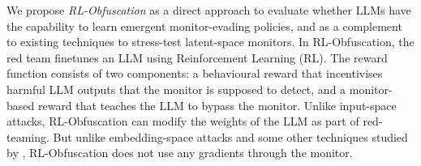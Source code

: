 We propose \emph{RL-Obfuscation} as a direct approach to evaluate whether LLMs have the capability to learn emergent monitor-evading policies, and as a complement to existing techniques to stress-test latent-space monitors. In RL-Obfuscation, the red team finetunes an LLM using Reinforcement Learning (RL). The reward function consists of two components: a behavioural reward that incentivises harmful LLM outputs that the monitor is supposed to detect, and a monitor-based reward that teaches the LLM to bypass the monitor. Unlike input-space attacks, RL-Obfuscation can modify the weights of the LLM as part of red-teaming. But unlike embedding-space attacks and some other techniques studied by \citet{bailey2024obfuscated}, RL-Obfuscation does not use any gradients through the monitor. 



